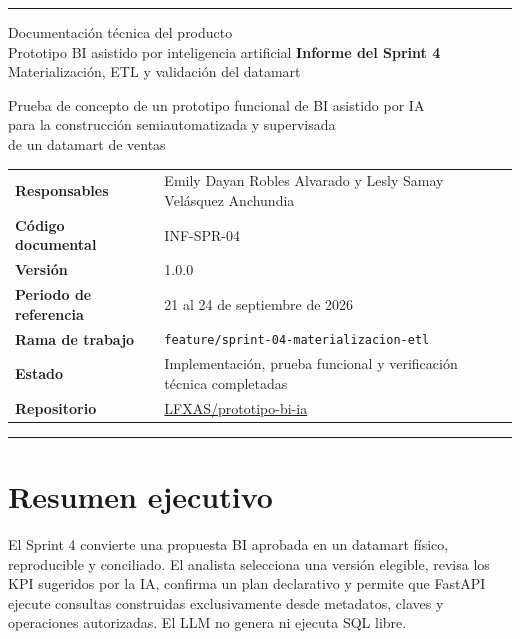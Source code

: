 \documentclass[11pt,letterpaper]{article}
\newcommand{\file}[1]{\texttt{#1}}
\begin{document}
\hypersetup{pageanchor=false}
\begin{titlepage}
  \thispagestyle{empty}
  \vspace*{0.8cm}
  {\color{ugblue}\rule{\textwidth}{2.8pt}}
  \vspace{1.2cm}
  {\Large Documentación técnica del producto\\[0.25em]
  Prototipo BI asistido por inteligencia artificial}
  \vfill
  {\color{deepgreen}\fontsize{28}{34}\selectfont\textbf{Informe del Sprint 4}}\\[0.7em]
  {\LARGE Materialización, ETL y validación del datamart}\\[0.6em]
  {\large Prueba de concepto de un prototipo funcional de BI asistido por IA\\
  para la construcción semiautomatizada y supervisada\\
  de un datamart de ventas\par}
  \vspace{1.4cm}
  \begin{tabularx}{\textwidth}{@{}>{\bfseries}l X@{}}
    Responsables & Emily Dayan Robles Alvarado y Lesly Samay Velásquez Anchundia \\
    Código documental & INF-SPR-04 \\
    Versión & 1.0.0 \\
    Periodo de referencia & 21 al 24 de septiembre de 2026 \\
    Rama de trabajo & \file{feature/sprint-04-materializacion-etl} \\
    Estado & Implementación, prueba funcional y verificación técnica completadas \\
    Repositorio & \href{https://github.com/LFXAS/prototipo-bi-ia}{LFXAS/prototipo-bi-ia} \\
  \end{tabularx}
  \vfill
  {\color{ugblue}\rule{\textwidth}{2.8pt}}
\end{titlepage}
\hypersetup{pageanchor=true}
\tableofcontents
\newpage
{}

\section{Resumen ejecutivo}

El Sprint 4 convierte una propuesta BI aprobada en un datamart físico, reproducible y conciliado. El analista selecciona una versión elegible, revisa los KPI sugeridos por la IA, confirma un plan declarativo y permite que FastAPI ejecute consultas construidas exclusivamente desde metadatos, claves y operaciones autorizadas. El LLM no genera ni ejecuta SQL libre.
\end{document}
